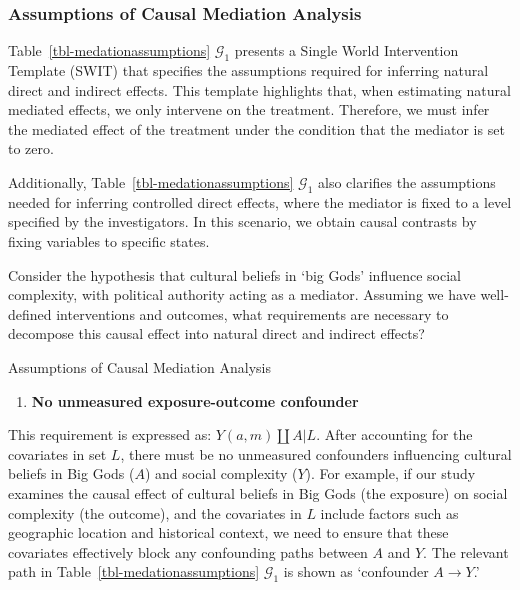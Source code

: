 \documentclass[
  single column]{article}
\providecommand{\tightlist}{%
  \setlength{\itemsep}{0pt}\setlength{\parskip}{0pt}}\usepackage{longtable,booktabs,array}
\begin{document}
\subsubsection{Assumptions of Causal Mediation
Analysis}\label{assumptions-of-causal-mediation-analysis}

Table~\ref{tbl-medationassumptions} \(\mathcal{G}_1\) presents a Single
World Intervention Template (SWIT) that specifies the assumptions
required for inferring natural direct and indirect effects. This
template highlights that, when estimating natural mediated effects, we
only intervene on the treatment. Therefore, we must infer the mediated
effect of the treatment under the condition that the mediator is set to
zero.

Additionally, Table~\ref{tbl-medationassumptions} \(\mathcal{G}_1\) also
clarifies the assumptions needed for inferring controlled direct
effects, where the mediator is fixed to a level specified by the
investigators. In this scenario, we obtain causal contrasts by fixing
variables to specific states.

Consider the hypothesis that cultural beliefs in `big Gods' influence
social complexity, with political authority acting as a mediator.
Assuming we have well-defined interventions and outcomes, what
requirements are necessary to decompose this causal effect into natural
direct and indirect effects?

\begin{table}

\caption{\label{tbl-medationassumptions}Assumptions of Causal Mediation
Analysis}

\centering{

\mediationassumptionsswig

}

\end{table}%

\begin{enumerate}
\def\labelenumi{\arabic{enumi}.}
\tightlist
\item
  \textbf{No unmeasured exposure-outcome confounder}
\end{enumerate}

This requirement is expressed as: \(Y(a,m) \coprod A | L\). After
accounting for the covariates in set \(L\), there must be no unmeasured
confounders influencing cultural beliefs in Big Gods (\(A\)) and social
complexity (\(Y\)). For example, if our study examines the causal effect
of cultural beliefs in Big Gods (the exposure) on social complexity (the
outcome), and the covariates in \(L\) include factors such as geographic
location and historical context, we need to ensure that these covariates
effectively block any confounding paths between \(A\) and \(Y\). The
relevant path in Table~\ref{tbl-medationassumptions} \(\mathcal{G}_1\)
is shown as `confounder \(A \to Y\).'
\end{document}
